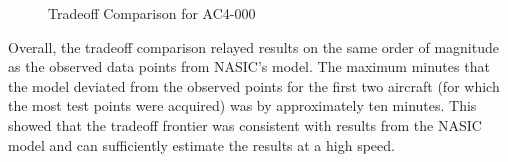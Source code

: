\begin{figure}%
    \centering
    \qquad
    \qquad
    \caption{Tradeoff Comparison for AC4-000}%
    \label{fig:tradec4}
\end{figure}
Overall, the tradeoff comparison relayed results on the same order of magnitude as the observed data points from NASIC's model. The maximum minutes that the model deviated from the observed points for the first two aircraft (for which the most test points were acquired) was by approximately ten minutes. This showed that the tradeoff frontier was consistent with results from the NASIC model and can sufficiently estimate the results at a high speed.\par
